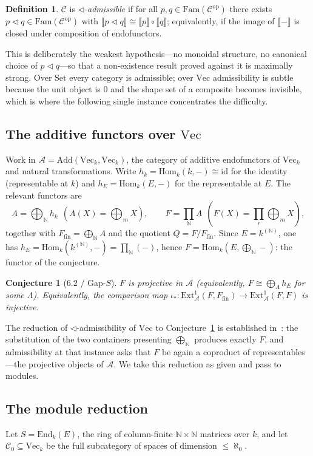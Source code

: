 \documentclass[11pt,reqno]{amsart}
\theoremstyle{plain}
\newtheorem{conjecture}[theorem]{Conjecture}
\theoremstyle{definition}
\newtheorem{definition}[theorem]{Definition}
\theoremstyle{remark}
\renewcommand{\Vec}{\mathrm{Vec}}
\newcommand{\Set}{\mathrm{Set}}
\newcommand{\Fam}{\mathrm{Fam}}
\newcommand{\Add}{\mathrm{Add}}
\newcommand{\End}{\mathrm{End}}
\newcommand{\Hom}{\mathrm{Hom}}
\newcommand{\Ext}{\mathrm{Ext}}
\newcommand{\op}{\mathrm{op}}
\newcommand{\tri}{\triangleleft}
\newcommand{\den}[1]{\llbracket #1 \rrbracket}
\newcommand{\C}{\mathcal{C}}
\newcommand{\A}{\mathcal{A}}
\newcommand{\N}{\mathbb{N}}
\begin{document}
\begin{definition}\label{def:adm}
$\C$ is \emph{$\tri$-admissible} if for all $p,q\in\Fam(\C^{\op})$ there exists $p\tri q\in\Fam(\C^{\op})$ with $\den{p\tri q}\cong\den{p}\circ\den{q}$; equivalently, if the image of $\den{-}$ is closed under composition of endofunctors.
\end{definition}

This is deliberately the weakest hypothesis---no monoidal structure, no canonical choice of $p\tri q$---so that a non-existence result proved against it is maximally strong. Over $\Set$ every category is admissible; over $\Vec$ admissibility is subtle because the unit object is $0$ and the shape set of a composite becomes invisible, which is where the following single instance concentrates the difficulty.

\subsection{The additive functors over \texorpdfstring{$\Vec$}{Vec}}
Work in $\A=\Add(\Vec_k,\Vec_k)$, the category of additive endofunctors of $\Vec_k$ and natural transformations. Write $h_k=\Hom_k(k,-)\cong\mathrm{id}$ for the identity (representable at $k$) and $h_E=\Hom_k(E,-)$ for the representable at $E$. The relevant functors are
\[
  A=\bigoplus_{\N}h_k\ \ (A(X)=\textstyle\bigoplus_m X),\qquad
  F=\prod_{\N}A\ \ (F(X)=\textstyle\prod_r\bigoplus_m X),
\]
together with $F_{\mathrm{fin}}=\bigoplus_{\N}A$ and the quotient $Q=F/F_{\mathrm{fin}}$. Since $E=k^{(\N)}$, one has $h_E=\Hom_k(k^{(\N)},-)=\prod_{\N}(-)$, hence $F=\Hom_k(E,\bigoplus_{\N}-)$: the functor of the conjecture.

\begin{conjecture}[6.2 / Gap-$S$]\label{conj:62}
$F$ is projective in $\A$ (equivalently, $F\cong\bigoplus_{\Lambda}h_E$ for some $\Lambda$). Equivalently, the comparison map $\iota_*\colon\Ext^1_{\A}(F,F_{\mathrm{fin}})\to\Ext^1_{\A}(F,F)$ is injective.
\end{conjecture}

The reduction of $\tri$-admissibility of $\Vec$ to Conjecture~\ref{conj:62} is established in~\cite{macbeth-admissibility,macbeth-reduction}: the substitution of the two containers presenting $\bigoplus_{\N}$ produces exactly $F$, and admissibility at that instance asks that $F$ be again a coproduct of representables---the projective objects of $\A$. We take this reduction as given and pass to modules.

\subsection{The module reduction}
Let $S=\End_k(E)$, the ring of column-finite $\N\times\N$ matrices over $k$, and let $\C_0\subseteq\Vec_k$ be the full subcategory of spaces of dimension $\le\aleph_0$.
\end{document}
